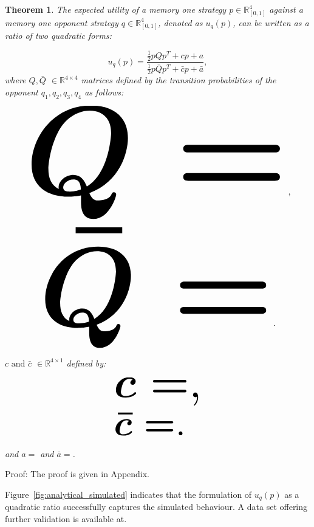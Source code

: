 \documentclass[10pt]{article}
\newcommand{\R}{\mathbb{R}}
\newtheorem{theorem}{Theorem}
\begin{document}
\begin{theorem}\label{theorem:quadratic_form_u}
    The expected utility of a memory one strategy \(p\in\mathbb{R}_{[0,1]}^4\)
    against a memory one opponent strategy \(q\in\mathbb{R}_{[0,1]}^4\), denoted
    as \(u_q(p)\), can be written as a ratio of two quadratic forms:

    \begin{equation}\label{eq:optimisation_quadratic}
    u_q(p) = \frac{\frac{1}{2}pQp^T + cp + a}
                {\frac{1}{2}p\bar{Q}p^T + \bar{c}p + \bar{a}}, 
    \end{equation}
    where \(Q, \bar{Q}\) \(\in \R^{4\times4}\) matrices defined by the transition
    probabilities of the opponent \(q_1, q_2, q_3, q_4\) as follows:
    
    \begin{center}
    \begin{equation}
    \resizebox{0.9\linewidth}{!}{\arraycolsep=2.5pt%
    \boldmath\(
    Q = \)},
    \end{equation}
    \begin{equation}\label{eq:q_bar_matrix}
    \resizebox{0.8\linewidth}{!}{\arraycolsep=2.5pt%
    \boldmath\(
    \bar{Q} =  \)}.
    \end{equation}
    \end{center}
    
    \(c \text{ and } \bar{c}\) \(\in \R^{4 \times 1}\) defined by:
    
    \begin{equation}\label{eq:q_matrix_numerator}
    \resizebox{0.3\linewidth}{!}{\arraycolsep=2.5pt%
    \boldmath\(c = \),}
    \end{equation}
    \begin{equation}\label{eq:q_matrix_denominator}
    \resizebox{0.3\linewidth}{!}{\arraycolsep=2.5pt%
    \boldmath\(\bar{c} = \).
    }
    \end{equation}
    
    and \(a = \) and 
    \(\bar{a} = \).
\end{theorem}

Proof: The proof is given in Appendix. %

Figure~\ref{fig:analytical_simulated} indicates that the  formulation of \(u_q(p)\)
as a quadratic ratio successfully captures the simulated behaviour. A data set
offering further validation is available at. %
\end{document}

